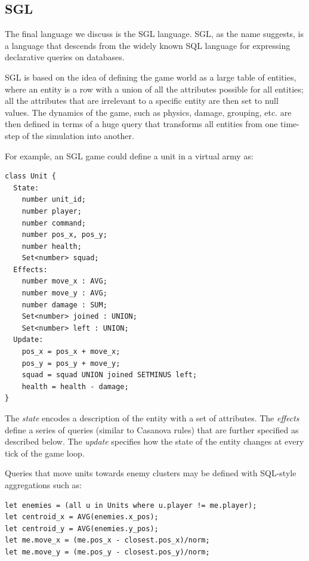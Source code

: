 \subsection{SGL}
The final language we discuss is the SGL language. SGL, as the name suggests, is a language that descends from the widely known SQL language for expressing declarative queries on databases. 

SGL is based on the idea of defining the game world as a large table of entities, where an entity is a row with a union of all the attributes possible for all entities; all the attributes that are irrelevant to a specific entity are then set to null values. The dynamics of the game, such as physics, damage, grouping, etc. are then defined in terms of a huge query that transforms all entities from one time-step of the simulation into another.

For example, an SGL game could define a unit in a virtual army as:

\begin{lstlisting}
class Unit {
  State:
    number unit_id;
    number player;
    number command;
    number pos_x, pos_y;
    number health;
    Set<number> squad;
  Effects:
    number move_x : AVG;
    number move_y : AVG;
    number damage : SUM;
    Set<number> joined : UNION;
    Set<number> left : UNION;
  Update:
    pos_x = pos_x + move_x;
    pos_y = pos_y + move_y;
    squad = squad UNION joined SETMINUS left;
    health = health - damage;
}	
\end{lstlisting}

The \textit{state} encodes a description of the entity with a set of attributes. The \textit{effects} define a series of queries (similar to Casanova rules) that are further specified as described below. The \textit{update} specifies how the state of the entity changes at every tick of the game loop.

Queries that move units towards enemy clusters may be defined with SQL-style aggregations such as:

\begin{lstlisting}
let enemies = (all u in Units where u.player != me.player);
let centroid_x = AVG(enemies.x_pos);
let centroid_y = AVG(enemies.y_pos);
let me.move_x = (me.pos_x - closest.pos_x)/norm;
let me.move_y = (me.pos_y - closest.pos_y)/norm;
\end{lstlisting}

